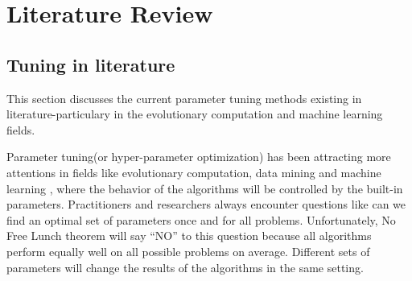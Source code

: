 \section{Literature Review} 

\subsection{Tuning in literature}
This section discusses the current parameter tuning methods existing in literature-particulary
in the evolutionary computation and machine learning fields.


Parameter tuning(or hyper-parameter optimization) has been attracting more attentions in fields like evolutionary
computation, data mining and  machine learning \cite{lobo2007parameter,Bergstra2012}, where the behavior of the algorithms will be controlled by the built-in parameters.  Practitioners and researchers always encounter questions like can we find an optimal set of parameters once and for all problems. Unfortunately, No Free Lunch theorem \cite{wolpert1997no} will say ``NO'' to this question because all algorithms perform equally well on all possible problems on average. Different sets of parameters will change the results of the algorithms in the same setting.

